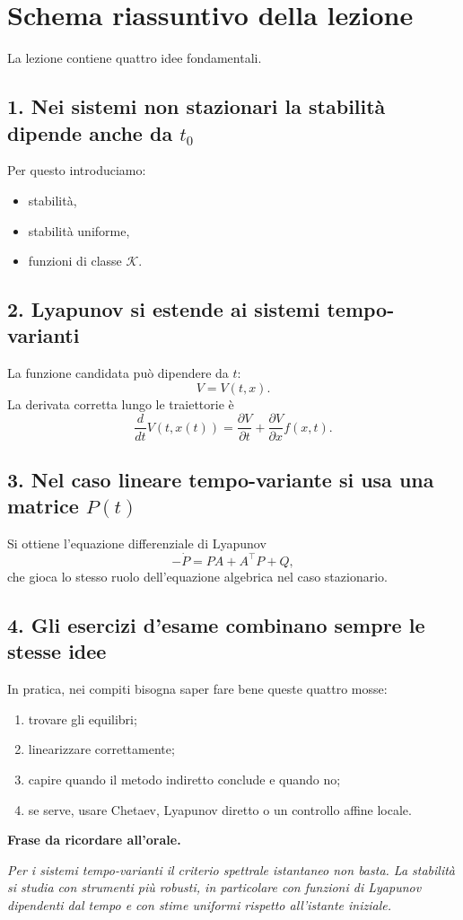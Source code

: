 \section{Schema riassuntivo della lezione}

La lezione contiene quattro idee fondamentali.

\subsection*{1. Nei sistemi non stazionari la stabilit\`a dipende anche da \(t_0\)}

Per questo introduciamo:
\begin{itemize}
    \item stabilit\`a,
    \item stabilit\`a uniforme,
    \item funzioni di classe \(\mathcal K\).
\end{itemize}

\subsection*{2. Lyapunov si estende ai sistemi tempo-varianti}

La funzione candidata pu\`o dipendere da \(t\):
\[
V=V(t,x).
\]
La derivata corretta lungo le traiettorie \`e
\[
\frac{d}{dt}V(t,x(t))
=
\frac{\partial V}{\partial t}
+
\frac{\partial V}{\partial x}f(x,t).
\]

\subsection*{3. Nel caso lineare tempo-variante si usa una matrice \(P(t)\)}

Si ottiene l'equazione differenziale di Lyapunov
\[
-\dot P = PA + A^\top P + Q,
\]
che gioca lo stesso ruolo dell'equazione algebrica nel caso stazionario.

\subsection*{4. Gli esercizi d'esame combinano sempre le stesse idee}

In pratica, nei compiti bisogna saper fare bene queste quattro mosse:
\begin{enumerate}
    \item trovare gli equilibri;
    \item linearizzare correttamente;
    \item capire quando il metodo indiretto conclude e quando no;
    \item se serve, usare Chetaev, Lyapunov diretto o un controllo affine locale.
\end{enumerate}

\medskip

\noindent
\textbf{Frase da ricordare all'orale.}
\begin{center}
\emph{Per i sistemi tempo-varianti il criterio spettrale istantaneo non basta. La stabilit\`a si studia con strumenti pi\`u robusti, in particolare con funzioni di Lyapunov dipendenti dal tempo e con stime uniformi rispetto all'istante iniziale.}
\end{center}
